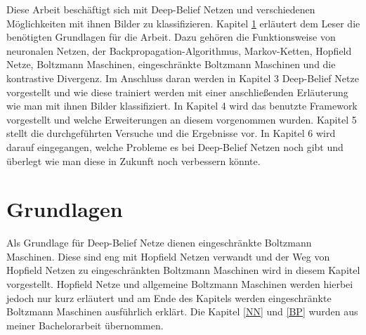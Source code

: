 \documentclass[12pt]{article}
\begin{document}
	Diese Arbeit beschäftigt sich mit Deep-Belief Netzen und verschiedenen Möglichkeiten mit ihnen Bilder zu klassifizieren. Kapitel \ref{Grundlagen} erläutert dem Leser die benötigten Grundlagen für die Arbeit. Dazu gehören die Funktionsweise von neuronalen Netzen, der Backpropagation-Algorithmus, Markov-Ketten, Hopfield Netze, Boltzmann Maschinen, eingeschränkte Boltzmann Maschinen und die kontrastive Divergenz. Im Anschluss daran werden in Kapitel 3 Deep-Belief Netze vorgestellt und wie diese trainiert werden mit einer anschließenden Erläuterung wie man mit ihnen Bilder klassifiziert. In Kapitel 4 wird das benutzte Framework vorgestellt und welche Erweiterungen an diesem vorgenommen wurden. Kapitel 5 stellt die durchgeführten Versuche und die Ergebnisse vor. In Kapitel 6 wird darauf eingegangen, welche Probleme es bei Deep-Belief Netzen noch gibt und überlegt wie man diese in Zukunft noch verbessern könnte. 

	\section{Grundlagen}
	\label{Grundlagen}
	Als Grundlage für Deep-Belief Netze dienen eingeschränkte Boltzmann Maschinen. Diese sind eng mit Hopfield Netzen verwandt und der Weg von Hopfield Netzen zu eingeschränkten Boltzmann Maschinen wird in diesem Kapitel vorgestellt. Hopfield Netze und allgemeine Boltzmann Maschinen werden hierbei jedoch nur kurz erläutert und am Ende des Kapitels werden eingeschränkte Boltzmann Maschinen ausführlich erklärt. Die Kapitel \ref{NN} und \ref{BP} wurden aus meiner Bachelorarbeit \cite{bachelor} übernommen.
\end{document}

